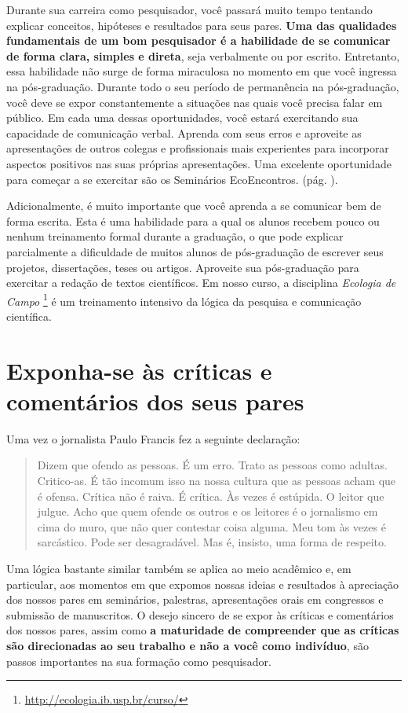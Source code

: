 \documentclass[twoside a4paper 12pt]{report}
\begin{document}
Durante sua carreira como pesquisador, você passará muito tempo tentando explicar conceitos, hipóteses e resultados para seus pares. \textbf{Uma das qualidades fundamentais de um bom pesquisador é a habilidade de se comunicar de forma clara, simples e direta}, seja verbalmente ou por escrito. Entretanto, essa habilidade não surge de forma miraculosa no momento em que você ingressa na pós-graduação. Durante todo o seu período de permanência na pós-graduação, você deve se expor constantemente a situações nas quais você precisa falar em público. Em cada uma dessas oportunidades, você estará exercitando sua capacidade de comunicação verbal. Aprenda com seus erros e aproveite as apresentações de outros colegas e profissionais mais experientes para incorporar aspectos positivos nas suas próprias apresentações. Uma excelente oportunidade para começar a se exercitar são os Seminários EcoEncontros. (pág. \pageref{subsec:seminarios}).

Adicionalmente, é muito importante que você aprenda a se comunicar bem de forma escrita. Esta é uma habilidade para a qual os alunos recebem pouco ou nenhum treinamento formal durante a graduação, o que pode explicar parcialmente a dificuldade de muitos alunos de pós-graduação de escrever seus projetos, dissertações, teses ou artigos. Aproveite sua pós-graduação para exercitar a redação de textos científicos. Em nosso curso, a disciplina \emph{Ecologia de Campo} \footnote{\url{http://ecologia.ib.usp.br/curso/}} é um treinamento intensivo da lógica da pesquisa e comunicação científica.

\section{Exponha-se às críticas e comentários dos seus pares}

Uma vez o jornalista Paulo Francis fez a seguinte declaração: 

\begin{quote}
Dizem que ofendo as pessoas. É um erro. Trato as pessoas como adultas. Critico-as. É tão
incomum isso na nossa cultura que as pessoas acham que é ofensa. Crítica não é raiva.
É crítica. Às vezes é estúpida. O leitor que julgue. Acho que quem ofende os outros e os
leitores é o jornalismo em cima do muro, que não quer contestar coisa alguma. Meu
tom às vezes é sarcástico. Pode ser desagradável. Mas é, insisto, uma forma de
respeito.  
\end{quote}

Uma lógica bastante similar também se aplica ao meio acadêmico e, em particular, aos momentos em que expomos nossas ideias e resultados à apreciação dos nossos pares em seminários, palestras, apresentações orais em congressos e submissão de manuscritos. O desejo sincero de se expor às críticas e comentários dos nossos pares, assim como \textbf{a maturidade de compreender que as críticas são direcionadas ao seu trabalho e não a você como indivíduo}, são passos importantes na sua formação como pesquisador.
\end{document}
